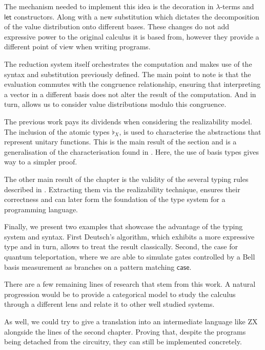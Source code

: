 \documentclass[runningheads,orivec,envcountsame,envcountsect]{llncs}
\newcommand\basis[1]{\ensuremath{\flat_{#1}}}
\begin{document}
The mechanism needed to implement this idea is the decoration in $\lambda$-terms and $\mathsf{let}$ constructors. Along with a new substitution which dictates the decomposition of the value distribution onto different bases. These changes do not add expressive power to the original calculus it is based from, however they provide a different point of view when writing programs. 

The reduction system itself orchestrates the computation and makes use of the syntax and substitution previously defined. The main point to note is that the evaluation commutes with the congruence relationship, ensuring that interpreting a vector in a different basis does not alter the result of the computation. And in turn, allows us to consider value distributions modulo this congruence.

The previous work pays its dividends when considering the realizability model. The inclusion of the atomic types $\basis{X}$, is used to characterise the abstractions that represent unitary functions. This is the main result of the section and is a generalisation of the characterisation found in \cite{DiazcaroGuillermoMiquelValironLICS19}. Here, the use of basis types gives way to a simpler proof. 

The other main result of the chapter is the validity of the several typing rules described in . Extracting them via the realizability technique, ensures their correctness and can later form the foundation of the type system for a programming language.

Finally, we present two examples that showcase the advantage of the typing system and syntax. First Deutsch's algorithm, which exhibits a more expressive type and in turn, allows to treat the result classically. Second, the case for quantum teleportation, where we are able to simulate gates controlled by a Bell basis measurement as branches on a pattern matching $\mathsf{case}$. 

There are a few remaining lines of research that stem from this work. A natural progression would be to provide a categorical model to study the calculus through a different lens and relate it to other well studied systems. 

As well, we could try to give a translation into an intermediate language like ZX alongside the lines of the second chapter. Proving that, despite the programs being detached from the circuitry, they can still be  implemented concretely.
\end{document}
